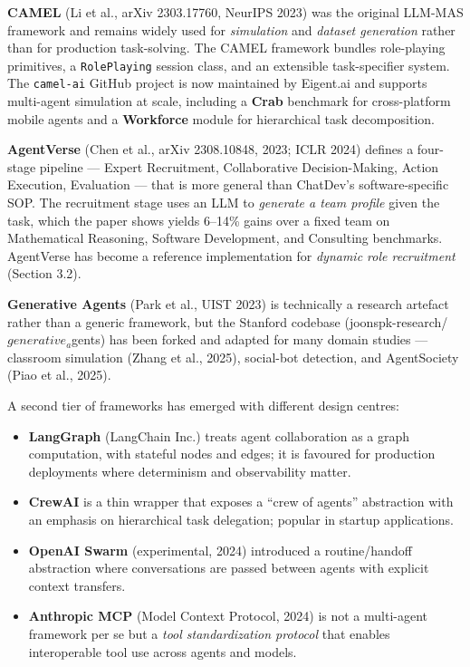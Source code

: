 \textbf{CAMEL} (Li et al., arXiv 2303.17760, NeurIPS 2023) was the original LLM-MAS framework and remains widely used for \emph{simulation} and \emph{dataset generation} rather than for production task-solving. The CAMEL framework bundles role-playing primitives, a \texttt{RolePlaying} session class, and an extensible task-specifier system. The \texttt{camel-ai} GitHub project is now maintained by Eigent.ai and supports multi-agent simulation at scale, including a \textbf{Crab} benchmark for cross-platform mobile agents and a \textbf{Workforce} module for hierarchical task decomposition.

\textbf{AgentVerse} (Chen et al., arXiv 2308.10848, 2023; ICLR 2024) defines a four-stage pipeline --- Expert Recruitment, Collaborative Decision-Making, Action Execution, Evaluation --- that is more general than ChatDev's software-specific SOP. The recruitment stage uses an LLM to \emph{generate a team profile} given the task, which the paper shows yields 6--14\% gains over a fixed team on Mathematical Reasoning, Software Development, and Consulting benchmarks. AgentVerse has become a reference implementation for \emph{dynamic role recruitment} (Section 3.2).

\textbf{Generative Agents} (Park et al., UIST 2023) is technically a research artefact rather than a generic framework, but the Stanford codebase (joonspk-research/\(generative_a\)gents) has been forked and adapted for many domain studies --- classroom simulation (Zhang et al., 2025), social-bot detection, and AgentSociety (Piao et al., 2025).

A second tier of frameworks has emerged with different design centres:

\begin{itemize}
\tightlist
\item
  \textbf{LangGraph} (LangChain Inc.) treats agent collaboration as a graph computation, with stateful nodes and edges; it is favoured for production deployments where determinism and observability matter.
\item
  \textbf{CrewAI} is a thin wrapper that exposes a ``crew of agents'' abstraction with an emphasis on hierarchical task delegation; popular in startup applications.
\item
  \textbf{OpenAI Swarm} (experimental, 2024) introduced a routine/handoff abstraction where conversations are passed between agents with explicit context transfers.
\item
  \textbf{Anthropic MCP} (Model Context Protocol, 2024) is not a multi-agent framework per se but a \emph{tool standardization protocol} that enables interoperable tool use across agents and models.
\end{itemize}

